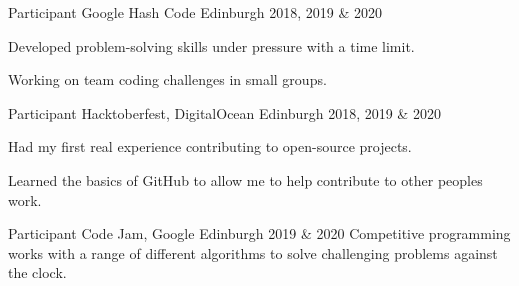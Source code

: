 \begin{cventries}
  \cventry
    {Participant} %
    {Google Hash Code} %
    {Edinburgh} %
    {2018, 2019 \& 2020} %
    {
      \begin{cvitems} %
        \item {Developed problem-solving skills under pressure with a time limit.}
        \item {Working on team coding challenges in small groups.}
      \end{cvitems}
    }


  \cventry
    {Participant} %
    {Hacktoberfest, DigitalOcean} %
    {Edinburgh} %
    {2018, 2019 \& 2020} %
    {
      \begin{cvitems} %
        \item {Had my first real experience contributing to open-source projects.}
        \item {Learned the basics of GitHub to allow me to help contribute to other peoples work.}
      \end{cvitems}
    }
    

  \cventry
     {Participant}
     {Code Jam, Google}
     {Edinburgh}
     {2019 \& 2020}
     {
      Competitive programming works with a range of different algorithms to solve challenging problems against the clock.
     }



\end{cventries}